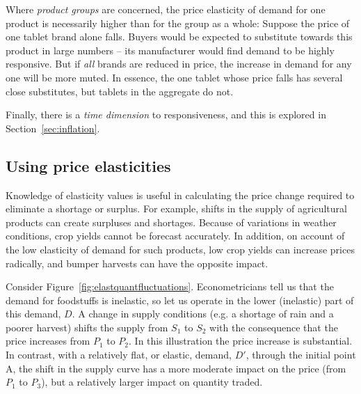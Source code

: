 Where \textit{product groups} are concerned, the price elasticity of demand for one product is necessarily higher than for the group as a whole: Suppose the price of one tablet brand alone falls. Buyers would be expected to substitute towards this product in large numbers -- its manufacturer would find demand to be highly responsive. But if \textit{all} brands are reduced in price, the increase in demand for any one will be more muted. In essence, the one tablet whose price falls has several close substitutes, but tablets in the aggregate do not. 

Finally, there is a \textit{time dimension} to responsiveness, and this is explored in Section~\ref{sec:inflation}.

\subsection*{Using price elasticities}

Knowledge of elasticity values is useful in calculating the price change required to eliminate a shortage or surplus. For example, shifts in the supply of agricultural products can create surpluses and shortages. Because of variations in weather conditions, crop yields cannot be forecast accurately. In addition, on account of the low elasticity of demand for such products, low crop yields can increase prices radically, and bumper harvests can have the opposite impact.

Consider Figure~\ref{fig:elastquantfluctuations}. Econometricians tell us that the demand for foodstuffs is inelastic, so let us operate in the lower (inelastic) part of this demand, $D$. A change in supply conditions (e.g.  a shortage of rain and a poorer harvest) shifts the supply from $S_1$ to $S_2$ with the consequence that the price increases from $P_1$ to $P_2$. In this illustration the price increase is substantial.  In contrast, with a relatively flat, or elastic, demand, $D'$, through the initial point A, the shift in the supply curve has a more moderate impact on the price (from $P_1$ to $P_3$), but a relatively larger impact on quantity traded. 


